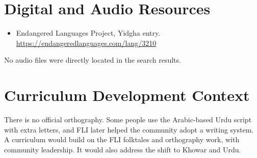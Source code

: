 \documentclass[12pt]{article}
\begin{document}
\section{Digital and Audio Resources}
\begin{itemize}
\item Endangered Languages Project, Yidgha entry. \url{https://endangeredlanguages.com/lang/3210}
\end{itemize}
No audio files were directly located in the search results.

\section{Curriculum Development Context}
There is no official orthography. Some people use the Arabic-based Urdu script with extra letters, and FLI later helped the community adopt a writing system. A curriculum would build on the FLI folktales and orthography work, with community leadership. It would also address the shift to Khowar and Urdu.
\end{document}
